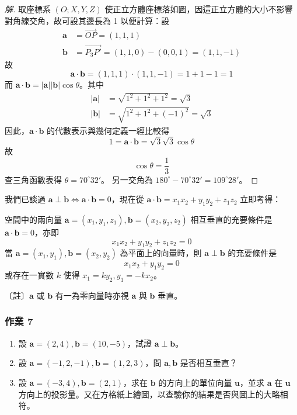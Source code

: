 \begin{proof}[解]
取座標系 $(O; X, Y, Z)$ 使正立方體座標落如圖，因這正立方體的大小不影響對角線交角，故可設其邊長為 1 以便計算：設
\begin{align*}
\mathbf{a} &= \vec{OP} = (1, 1, 1) \\
\mathbf{b} &= \vec{P_3 P'} = (1, 1, 0) - (0, 0, 1) = (1, 1, -1)
\end{align*}
故
\[ \mathbf{a}\cdot\mathbf{b} = (1, 1, 1)\cdot(1, 1, -1) = 1 + 1 - 1 = 1 \]
而 $\mathbf{a}\cdot\mathbf{b} = |\mathbf{a}||\mathbf{b}|\cos\theta$。其中
\begin{align*}
|\mathbf{a}| &= \sqrt{1^2 + 1^2 + 1^2} = \sqrt{3} \\
|\mathbf{b}| &= \sqrt{1^2 + 1^2 + (-1)^2} = \sqrt{3}
\end{align*}
因此，$\mathbf{a}\cdot\mathbf{b}$ 的代數表示與幾何定義一經比較得
\[ 1 = \mathbf{a}\cdot\mathbf{b} = \sqrt{3}\sqrt{3}\cos\theta \]
故
\[ \cos\theta = \frac{1}{3} \]
查三角函數表得 $\theta = 70^\circ 32'$。
另一交角為 $180^\circ - 70^\circ 32' = 109^\circ 28'$。\qedhere
\end{proof}

我們已談過 $\mathbf{a} \perp \mathbf{b} \iff \mathbf{a}\cdot\mathbf{b} = 0$，現在從 $\mathbf{a}\cdot\mathbf{b} = x_1 x_2 + y_1 y_2 + z_1 z_2$ 立即考得：

\begin{proposition}
空間中的兩向量 $\mathbf{a} = (x_1, y_1, z_1), \mathbf{b} = (x_2, y_2, z_2)$ 相互垂直的充要條件是 $\mathbf{a}\cdot\mathbf{b} = 0$，亦即
\[ x_1 x_2 + y_1 y_2 + z_1 z_2 = 0 \]
當 $\mathbf{a} = (x_1, y_1), \mathbf{b} = (x_2, y_2)$ 為平面上的向量時，則 $\mathbf{a} \perp \mathbf{b}$ 的充要條件是
\[ x_1 x_2 + y_1 y_2 = 0 \]
或存在一實數 $k$ 使得 $x_1 = k y_2, y_1 = -k x_2$。
\end{proposition}
〔註〕$\mathbf{a}$ 或 $\mathbf{b}$ 有一為零向量時亦視 $\mathbf{a}$ 與 $\mathbf{b}$ 垂直。

\subsubsection*{作業 7}
\begin{enumerate}[label=(\roman*), leftmargin=2em]
  \item 設 $\mathbf{a} = (2, 4), \mathbf{b} = (10, -5)$，試證 $\mathbf{a} \perp \mathbf{b}$。
  \item 設 $\mathbf{a} = (-1, 2, -1), \mathbf{b} = (1, 2, 3)$，問 $\mathbf{a}, \mathbf{b}$ 是否相互垂直？
  \item 設 $\mathbf{a} = (-3, 4), \mathbf{b} = (2, 1)$，求在 $\mathbf{b}$ 的方向上的單位向量 $\mathbf{u}$，並求 $\mathbf{a}$ 在 $\mathbf{u}$ 方向上的投影量。又在方格紙上繪圖，以查驗你的結果是否與圖上的大略相符。
\end{enumerate}

